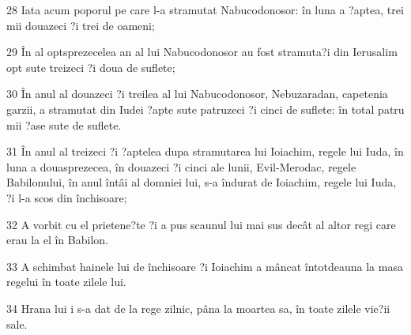 \par 28 Iata acum poporul pe care l-a stramutat Nabucodonosor: în luna a ?aptea, trei mii douazeci ?i trei de oameni;
\par 29 În al optsprezecelea an al lui Nabucodonosor au fost stramuta?i din Ierusalim opt sute treizeci ?i doua de suflete;
\par 30 În anul al douazeci ?i treilea al lui Nabucodonosor, Nebuzaradan, capetenia garzii, a stramutat din Iudei ?apte sute patruzeci ?i cinci de suflete: în total patru mii ?ase sute de suflete.
\par 31 În anul al treizeci ?i ?aptelea dupa stramutarea lui Ioiachim, regele lui Iuda, în luna a douasprezecea, în douazeci ?i cinci ale lunii, Evil-Merodac, regele Babilonului, în anul întâi al domniei lui, s-a îndurat de Ioiachim, regele lui Iuda, ?i l-a scos din închisoare;
\par 32 A vorbit cu el prietene?te ?i a pus scaunul lui mai sus decât al altor regi care erau la el în Babilon.
\par 33 A schimbat hainele lui de închisoare ?i Ioiachim a mâncat întotdeauna la masa regelui în toate zilele lui.
\par 34 Hrana lui i s-a dat de la rege zilnic, pâna la moartea sa, în toate zilele vie?ii sale.


